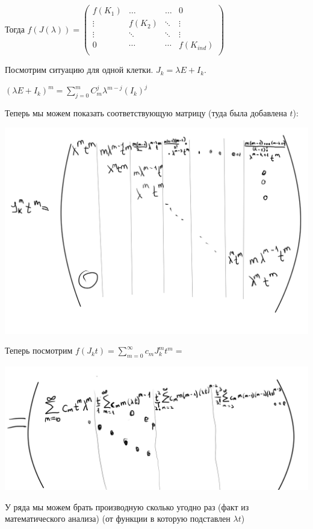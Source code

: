 Тогда $f(J(\lambda)) = \begin{pmatrix}
   f(K_1) & \ldots & \ldots & 0 \\
    \vdots & f(K_2) & \ddots & \vdots\\
    \vdots & \ddots & \ddots & \vdots\\
    0 & \cdots & \cdots & f(K_{ind})\\
\end{pmatrix}$

Посмотрим ситуацию для одной клетки. $J_k = \lambda E + I_k$.

$(\lambda E + I_k)^m = \sum\limits_{j=0}^m C_m^j \lambda^{m-j} (I_k)^j  $ %

Теперь мы можем показать соответствующую матрицу (туда была добавлена $t$):
\begin{center}
 \includegraphics[width = 15cm]{assets/7_10-function.png}    
\end{center}
Теперь посмотрим $f(J_kt)=\sum\limits_{m=0}^{\infty}c_m J_k^mt^m = $
\begin{center}
 \includegraphics[width = 15cm]{assets/7_10-limit-function.png}    
\end{center}
У ряда мы можем брать производную сколько угодно раз (факт из математического анализа) (от функции в которую подставлен $\lambda t$)

